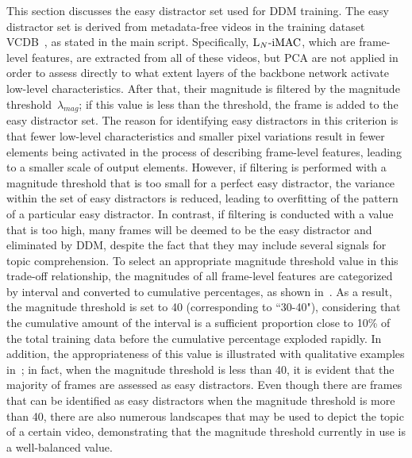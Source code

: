 \documentclass[10pt,twocolumn,letterpaper]{article}
\begin{document}
        This section discusses the easy distractor set used for DDM training. The easy distractor set is derived from metadata-free videos in the training dataset VCDB~\cite{jiang2014vcdb}, as stated in the main script. Specifically, $\textup{L}_{N}\textup{-iMAC}$, which are frame-level features, are extracted from all of these videos, but PCA are not applied in order to assess directly to what extent layers of the backbone network activate low-level characteristics. After that, their magnitude is filtered by the magnitude threshold~$\lambda_{mag}$; if this value is less than the threshold, the frame is added to the easy distractor set. The reason for identifying easy distractors in this criterion is that fewer low-level characteristics and smaller pixel variations result in fewer elements being activated in the process of describing frame-level features, leading to a smaller scale of output elements. However, if filtering is performed with a magnitude threshold that is too small for a perfect easy distractor, the variance within the set of easy distractors is reduced, leading to overfitting of the pattern of a particular easy distractor. In contrast, if filtering is conducted with a value that is too high, many frames will be deemed to be the easy distractor and eliminated by DDM, despite the fact that they may include several signals for topic comprehension. To select an appropriate magnitude threshold value in this trade-off relationship, the magnitudes of all frame-level features are categorized by interval and converted to cumulative percentages, as shown in~. As a result, the magnitude threshold is set to 40 (corresponding to ``30-40"), considering that the cumulative amount of the interval is a sufficient proportion close to 10\% of the total training data before the cumulative percentage exploded rapidly. In addition, the appropriateness of this value is illustrated with qualitative examples in~; in fact, when the magnitude threshold is less than 40, it is evident that the majority of frames are assessed as easy distractors. Even though there are frames that can be identified as easy distractors when the magnitude threshold is more than 40, there are also numerous landscapes that may be used to depict the topic of a certain video, demonstrating that the magnitude threshold currently in use is a well-balanced value.
    
        
    
    
\end{document}
